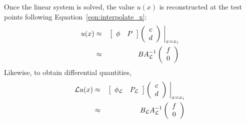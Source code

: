 \documentclass[11pt]{report}
\begin{document}
{Once the linear system is solved, the value $u(x)$ is reconstructed at the test points following Equation~\ref{eqn:interpolate_x}:
\begin{eqnarray}
u(x) & \approx &  \left.
\left[ \begin{array}{c c} 
       \phi &  P
	\end{array} \right]
	  \left( \begin{array}{cc}  c \\ d  \end{array} \right)  \ \right|_{x={x_i}} \nonumber\\
	 & \approx & B A^{-1}_\diffop{} \left( \begin{array}{cc}  f \\ 0  \end{array} \right) 
	\label{eqn:solve_u}
\end{eqnarray}
Likewise, to obtain differential quantities, 
\begin{eqnarray*}
\diffop{u}(x) & \approx & \left.
\left[ \begin{array}{c c} 
       \phi_{\diffop{}} &  P_{\diffop{}}
	\end{array} \right]
	  \left( \begin{array}{cc}  c \\ d  \end{array} \right)  \ \right|_{x={x_i}} \\
  	 & \approx & B_{\diffop{}} A^{-1}_\diffop{} \left( \begin{array}{cc}  f \\ 0  \end{array} \right)
	\label{eqn:solve_uxx}
\end{eqnarray*}



}
\end{document}
